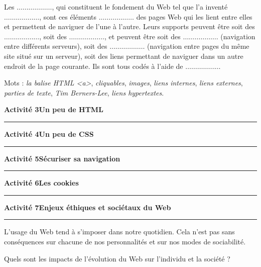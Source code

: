 \documentclass[a4paper]{article}
\begin{document}
\begin{enumerate}
    \smallskip

    Les $\hdots\hdots\hdots\hdots\hdots\hdots$, qui constituent le fondement du Web tel que l'a inventé $\hdots\hdots\hdots\hdots\hdots\hdots$, sont ces éléments $\hdots\hdots\hdots\hdots\hdots\hdots$ des pages Web qui les lient entre elles et permettent de naviguer de l'une à l'autre. Leurs supports peuvent être soit des $\hdots\hdots\hdots\hdots\hdots\hdots$, soit des $\hdots\hdots\hdots\hdots\hdots\hdots$, et peuvent être soit des $\hdots\hdots\hdots\hdots\hdots\hdots$ (navigation entre différents serveurs), soit des $\hdots\hdots\hdots\hdots\hdots\hdots$ (navigation entre pages du même site situé sur un serveur), soit des liens permettant de naviguer dans un autre endroit de la page courante. Ils sont tous codés à l'aide de $\hdots\hdots\hdots\hdots\hdots\hdots$

    Mots : \textit{la balise HTML <a>}, \textit{cliquables}, \textit{images}, \textit{liens internes}, \textit{liens externes}, \textit{parties de texte}, \textit{Tim Berners-Lee}, \textit{liens hypertextes}.

\end{enumerate}

\bigskip


\noindent\textbf{Activité 3}\hfill{}\textbf{Un peu de HTML}
\smallskip
\hrule
\medskip

\bigskip

\noindent\textbf{Activité 4}\hfill{}\textbf{Un peu de CSS}
\smallskip
\hrule
\medskip

\bigskip

\noindent\textbf{Activité 5}\hfill{}\textbf{Sécuriser sa navigation}
\smallskip
\hrule
\medskip

\bigskip

\noindent\textbf{Activité 6}\hfill{}\textbf{Les cookies}
\smallskip
\hrule
\medskip

\bigskip

\noindent\textbf{Activité 7}\hfill{}\textbf{Enjeux éthiques et sociétaux du Web}
\smallskip
\hrule
\medskip

\bigskip

L'usage du Web tend à s'imposer dans notre quotidien. Cela n'est pas sans conséquences sur chacune de nos personnalités et sur nos modes de sociabilité.

\begin{center}
  Quels sont les impacts de l'évolution du Web sur l'individu et la société ?
\end{center}
\end{document}
